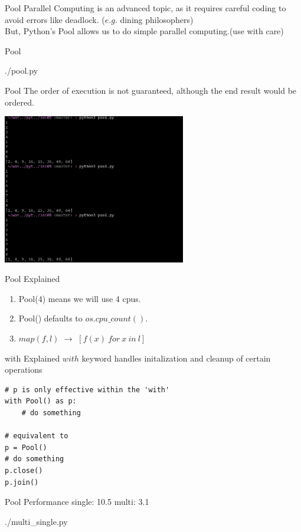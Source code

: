 \documentclass{beamer}
\begin{document}
\begin{frame}{Pool}
  Parallel Computing is an advanced topic, as it requires careful coding to
  avoid errors like deadlock. ($e.g.$ dining philosophers)\\
  But, Python's Pool allows us to do simple parallel computing.(use with care)
\end{frame}

\begin{frame}{Pool}
  \begin{lstinputlisting}
    {./pool.py}
  \end{lstinputlisting}
\end{frame}

\begin{frame}[fragile]{Pool}
  The order of execution is not guaranteed, although the end result would be
  ordered.
  \begin{center}
  \includegraphics[width=80mm]{./pool_result.png}
  \end{center}
\end{frame}

\begin{frame}{Pool Explained}
  \begin{enumerate}
    \item Pool(4) means we will use 4 cpus.
    \item Pool() defaults to $os.cpu\_count()$.\\
    \item $map(f, l)$ $\rightarrow$ $[f(x)\ for\ x\ in\ l]$\\
  \end{enumerate}
\end{frame}

\begin{frame}[fragile]{with Explained}
 $with$ keyword handles initalization and cleanup of certain operations
\begin{lstlisting}
# p is only effective within the 'with'
with Pool() as p:
    # do something

# equivalent to
p = Pool()
# do something
p.close()
p.join()
\end{lstlisting}
\end{frame}

\begin{frame}{Pool Performance}
  single: 10.5 multi: 3.1
  \begin{lstinputlisting}
    {./multi_single.py}
  \end{lstinputlisting}
\end{frame}
\end{document}
